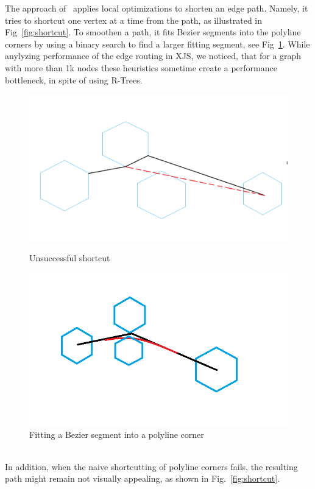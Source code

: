 \documentclass{gd-llncs}
\begin{document}
The approach of~\cite{dwyer2010fast} applies local optimizations to shorten an edge path.
Namely, it tries to shortcut one vertex at a time from the path, as illustrated in Fig~\ref{fig:shortcut}.
To smoothen a path, it fits Bezier segments into the polyline corners by
using a binary search to find a larger fitting segment, see Fig~\ref{fig:cornerfit}.
While anylyzing performance of the edge routing in XJS,
we noticed, that for a graph with more than 1k nodes these heuristics
sometime create a performance bottleneck, in spite of using R-Trees\cite{guttman1984r}.
\begin{figure}[!tbp]
  \centering
  \begin{minipage}[b]{0.4\textwidth}
    \includegraphics[width=\textwidth]{./naive_shorcut_now_working.png}
    \caption{Unsuccessful shortcut}
    \label{fig:shortcut}
  \end{minipage}
  \hfill
  \begin{minipage}[b]{0.4\textwidth}
    \includegraphics[width=\textwidth]{fillet_corner.png}
    \caption{Fitting a Bezier segment into a polyline corner}
    \label{fig:cornerfit}
  \end{minipage}
\end{figure}
\\
In addition, when the naive shortcutting of polyline corners fails,  the resulting path might remain not visually appealing, as shown in Fig.~\ref{fig:shortcut}.
\end{document}
